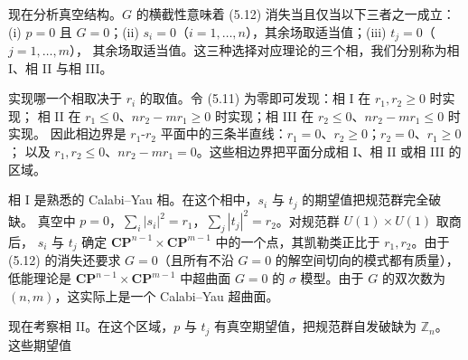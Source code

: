 现在分析真空结构。$G$ 的横截性意味着 (5.12) 消失当且仅当以下三者之一成立：(i) $p=0$ 且
$G=0$；(ii) $s_i=0$（$i=1,\dots,n$），其余场取适当值；(iii) $t_j=0$（$j=1,\dots,m$），
其余场取适当值。这三种选择对应理论的三个相，我们分别称为相 I、相 II 与相 III。

实现哪一个相取决于 $r_i$ 的取值。令 (5.11) 为零即可发现：相 I 在 $r_1,r_2\ge0$ 时实现；
相 II 在 $r_1\le0$、$nr_2-mr_1\ge0$ 时实现；相 III 在 $r_2\le0$、$nr_2-mr_1\le0$ 时实现。
因此相边界是 $r_1$-$r_2$ 平面中的三条半直线：$r_1=0$、$r_2\ge0$；$r_2=0$、$r_1\ge0$；
以及 $r_1,r_2\le0$、$nr_2-mr_1=0$。这些相边界把平面分成相 I、相 II 或相 III 的区域。

相 I 是熟悉的 Calabi--Yau 相。在这个相中，$s_i$ 与 $t_j$ 的期望值把规范群完全破缺。
真空中 $p=0$，$\sum_i|s_i|^2=r_1$，$\sum_j|t_j|^2=r_2$。对规范群 $U(1)\times U(1)$ 取商后，
$s_i$ 与 $t_j$ 确定 $\mathbf{CP}^{n-1}\times\mathbf{CP}^{m-1}$ 中的一个点，其凯勒类正比于
$r_1,r_2$。由于 (5.12) 的消失还要求 $G=0$（且所有不沿 $G=0$ 的解空间切向的模式都有质量），
低能理论是 $\mathbf{CP}^{n-1}\times\mathbf{CP}^{m-1}$ 中超曲面 $G=0$ 的 $\sigma$ 模型。由于 $G$
的双次数为 $(n,m)$，这实际上是一个 Calabi--Yau 超曲面。

现在考察相 II。在这个区域，$p$ 与 $t_j$ 有真空期望值，把规范群自发破缺为 $\mathbb{Z}_n$。
这些期望值

